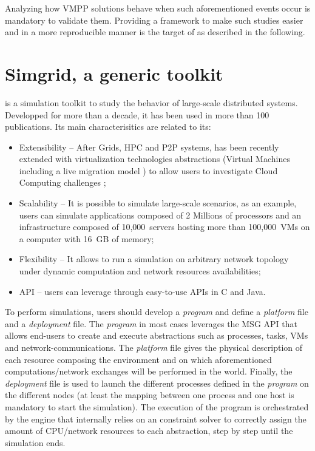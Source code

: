 Analyzing how VMPP solutions behave when such aforementioned events
occur is mandatory to validate them. Providing a framework to make
such studies easier and in a more reproducible manner is the target of \vmps as described in the
following.

\section{Simgrid, a generic toolkit}
\label{sec:sg}

\sg is a simulation toolkit to study the behavior of
large-scale distributed systems.  Developped for more than  a decade, it has been used in more than 100
publications.  Its main characterisitics are related to its:
\begin{itemize}
\item Extensibility -- After Grids, HPC and P2P
  systems, \sg has been recently extended with virtualization technologies abstractions
(\ie Virtual Machines including a live migration model \cite{Hirofuchi:2013:ALM:2568486.2568524}) to allow users to investigate Cloud
Computing challenges \cite{lucas:cloud2014};
\item Scalability -- It is possible to simulate large-scale scenarios,
  as an example, users can simulate applications composed of 2
  Millions of processors and an infrastructure composed of 10,000~servers hosting more than
  100,000~VMs on a computer with 16~GB of memory;
\item  Flexibility -- It allows to run a simulation on arbitrary network
  topology under dynamic computation and network resources
  availabilities;
\item API --  users can leverage \sg through easy-to-use APIs in C
  and Java.
\end{itemize}

To perform simulations, users should develop a \emph{program} and
define a \emph{platform} file and a \emph{deployment} file. The
\emph{program} in most cases leverages the \sg MSG API that allows
end-users to create and execute \sg abstractions such as processes,
tasks, VMs and network-communications. The \emph{platform} file gives
the physical description of each resource composing the environment
and on which aforementioned computations/network exchanges will be
performed in the \sg
world.
Finally, the \emph{deployment} file is used to launch the different
\sg processes defined in the \emph{program} on the different nodes (at
least the mapping between one process and one host is mandatory to
start the simulation). The execution of the program is orchestrated by
the \sg engine that internally relies on an constraint solver to
correctly assign the amount of CPU/network resources to each \sg
abstraction, step by step until the simulation ends.

